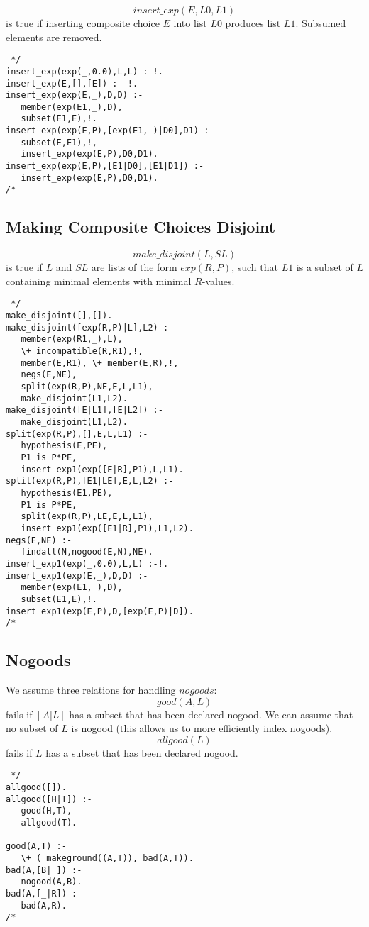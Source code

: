 \documentclass[11pt,fleqn]{article}
\begin{document}
\[insert\_exp(E,L0,L1)\]
is true if inserting composite choice $E$ into list $L0$ 
produces list $L1$. Subsumed elements are removed.
\begin{verbatim} */
insert_exp(exp(_,0.0),L,L) :-!.
insert_exp(E,[],[E]) :- !.
insert_exp(exp(E,_),D,D) :-
   member(exp(E1,_),D),
   subset(E1,E),!.
insert_exp(exp(E,P),[exp(E1,_)|D0],D1) :-
   subset(E,E1),!,
   insert_exp(exp(E,P),D0,D1).
insert_exp(exp(E,P),[E1|D0],[E1|D1]) :-
   insert_exp(exp(E,P),D0,D1).
/* \end{verbatim}

\subsection{Making Composite Choices Disjoint}

\[make\_disjoint(L,SL)\]
is true if $L$ and $SL$ are lists of the form $exp(R,P)$, such that
$L1$ is a subset of $L$ containing minimal elements with minimal
$R$-values.
\begin{verbatim} */
make_disjoint([],[]).
make_disjoint([exp(R,P)|L],L2) :-
   member(exp(R1,_),L),
   \+ incompatible(R,R1),!,
   member(E,R1), \+ member(E,R),!,
   negs(E,NE),
   split(exp(R,P),NE,E,L,L1),
   make_disjoint(L1,L2).
make_disjoint([E|L1],[E|L2]) :-
   make_disjoint(L1,L2).
split(exp(R,P),[],E,L,L1) :-
   hypothesis(E,PE),
   P1 is P*PE,
   insert_exp1(exp([E|R],P1),L,L1).
split(exp(R,P),[E1|LE],E,L,L2) :-
   hypothesis(E1,PE),
   P1 is P*PE,
   split(exp(R,P),LE,E,L,L1),
   insert_exp1(exp([E1|R],P1),L1,L2).
negs(E,NE) :-
   findall(N,nogood(E,N),NE).
insert_exp1(exp(_,0.0),L,L) :-!.
insert_exp1(exp(E,_),D,D) :-
   member(exp(E1,_),D),
   subset(E1,E),!.
insert_exp1(exp(E,P),D,[exp(E,P)|D]).
/* \end{verbatim}

\subsection{Nogoods}
We assume three relations for handling $nogoods$:
\[good(A,L)\]
fails if $[A|L]$ has a subset that has been declared nogood. We can
assume that no subset of $L$ is nogood (this allows us to more
efficiently index nogoods).
\[allgood(L)\]
fails if $L$ has a subset that has been declared nogood.
\begin{verbatim} */
allgood([]).
allgood([H|T]) :-
   good(H,T),
   allgood(T).

good(A,T) :-
   \+ ( makeground((A,T)), bad(A,T)).
bad(A,[B|_]) :-
   nogood(A,B).
bad(A,[_|R]) :-
   bad(A,R).
/* \end{verbatim}
\end{document}
